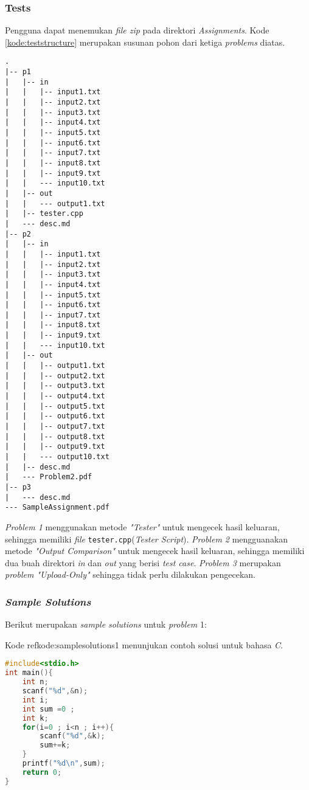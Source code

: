 \subsubsection{Tests}
Pengguna dapat menemukan \textit{file zip} pada direktori \textit{Assignments}. Kode \ref{kode:teststructure} merupakan susunan pohon dari ketiga \textit{problems} diatas.

\begin{lstlisting}[caption=Susunan pohon untuk ketiga \textit{problems}, label=kode:teststructure]
.
|-- p1
|   |-- in
|   |   |-- input1.txt
|   |   |-- input2.txt
|   |   |-- input3.txt
|   |   |-- input4.txt
|   |   |-- input5.txt
|   |   |-- input6.txt
|   |   |-- input7.txt
|   |   |-- input8.txt
|   |   |-- input9.txt
|   |   --- input10.txt
|   |-- out
|   |   --- output1.txt
|   |-- tester.cpp
|   --- desc.md
|-- p2
|   |-- in
|   |   |-- input1.txt
|   |   |-- input2.txt
|   |   |-- input3.txt
|   |   |-- input4.txt
|   |   |-- input5.txt
|   |   |-- input6.txt
|   |   |-- input7.txt
|   |   |-- input8.txt
|   |   |-- input9.txt
|   |   --- input10.txt
|   |-- out
|   |   |-- output1.txt
|   |   |-- output2.txt
|   |   |-- output3.txt
|   |   |-- output4.txt
|   |   |-- output5.txt
|   |   |-- output6.txt
|   |   |-- output7.txt
|   |   |-- output8.txt
|   |   |-- output9.txt
|   |   --- output10.txt
|   |-- desc.md
|   --- Problem2.pdf
|-- p3
|   --- desc.md
--- SampleAssignment.pdf
\end{lstlisting}

\textit{Problem 1} menggunakan metode \textit{"Tester"} untuk mengecek hasil keluaran, sehingga memiliki \textit{file} \verb|tester.cpp|(\textit{Tester Script}). \textit{Problem 2} mengguanakan metode \textit{"Output Comparison"} untuk mengecek hasil keluaran, sehingga memiliki dua buah direktori \textit{in} dan \textit{out} yang berisi \textit{test case}. \textit{Problem 3} merupakan \textit{problem "Upload-Only"} sehingga tidak perlu dilakukan pengecekan.

\subsubsection{\textit{Sample Solutions}}
Berikut merupakan \textit{sample solutions} untuk \textit{problem} 1:

Kode ref{kode:samplesolutions1} menunjukan contoh solusi untuk bahasa \textit{C}.
\begin{lstlisting}[language=C, caption=Contoh skrip PHP, label=kode:samplesolutions1]
#include<stdio.h>
int main(){
	int n;
	scanf("%d",&n);
	int i;
	int sum =0 ;
	int k;
	for(i=0 ; i<n ; i++){
		scanf("%d",&k);
		sum+=k;
	}
	printf("%d\n",sum);
	return 0;
}
\end{lstlisting}

